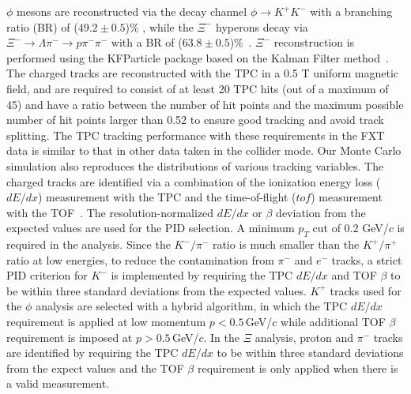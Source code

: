 \documentclass[aps,tightenlines,superscriptaddress,twocolumn]{revtex4-1}
\begin{document}
$\phi$ mesons are reconstructed via the decay channel $\phi\rightarrow K^+K^-$ with a branching ratio (BR) of ($49.2\pm0.5$)\% , while the $\Xi^{-}$ hyperons decay via $\Xi^-\rightarrow\Lambda\pi^-\rightarrow p\pi^-\pi^-$ with a BR of ($63.8\pm0.5$)\%~\cite{pdg:2020}. $\Xi^-$ reconstruction is performed using the KFParticle package based on the Kalman Filter method~\cite{Kisel:2018nvd,Kisel:2020lpa,STAR:2021gvx,STAR_PRL_Xi_Oemga_polarization:2021}. The charged tracks are reconstructed with the TPC in a 0.5 T uniform magnetic field, and are required to consist of at least 20 TPC hits (out of a maximum of 45) and have a ratio between the number of hit points and the maximum possible number of hit points larger than 0.52 to ensure good tracking and avoid track splitting. %
The TPC tracking performance with these requirements in the FXT data is similar to that in other data taken in the collider mode. Our Monte Carlo simulation also reproduces the distributions of various tracking variables.
The charged tracks are identified via a combination of the ionization energy loss ($dE/dx$) measurement with the TPC and the time-of-flight ($tof$) measurement with the TOF~\cite{Shao:2005iu,Xu:2008th}. 
The resolution-normalized $dE/dx$ or $\beta$ deviation from the expected values are used for the PID selection. 
A minimum $p_T$ cut of 0.2 GeV/$c$ is required in the analysis.
Since the $K^{-}/\pi^{-}$ ratio is much smaller than the $K^{+}/\pi^{+}$ ratio at low energies, to reduce the contamination from $\pi^{-}$ and $e^{-}$ tracks, a strict PID criterion for $K^{-}$ is implemented by requiring the TPC $dE/dx$ and TOF $\beta$ to be within three standard deviations from the expected values. $K^{+}$ tracks used for the $\phi$ analysis are selected with a hybrid algorithm, in which the TPC $dE/dx$ requirement is applied at low momentum $p<0.5$\,GeV/$c$ while additional TOF $\beta$ requirement is imposed at $p>0.5$\,GeV/$c$. In the $\Xi$ analysis, proton and $\pi^-$ tracks are identified by requiring the TPC $dE/dx$ to be within three standard deviations from the expect values and the TOF $\beta$ requirement is only applied when there is a valid measurement.
\end{document}
